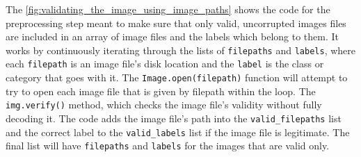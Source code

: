 \documentclass[12pt,onecolumn]{report}
\begin{document}
\begin{itemize}
    The \ref{fig:validating_the_image_using_image_paths} shows the code for the preprocessing step meant to make sure that only valid, uncorrupted images files are included in an array of image files and the labels which belong to them. It works by continuously iterating through the lists of \texttt{filepaths} and \texttt{labels}, where each \texttt{filepath} is an image file's disk location and the \texttt{label} is the class or category that goes with it. The \texttt{Image.open(filepath)} function will attempt to try to open each image file that is given by filepath within the loop. The \texttt{img.verify()} method, which checks the image file's validity without fully decoding it. The code adds the image file's path into the \texttt{valid\_filepaths} list and the correct label to the \texttt{valid\_labels} list if the image file is legitimate. The final list will have \texttt{filepaths} and \texttt{labels} for the images that are valid only.


\end{itemize}
\end{document}
